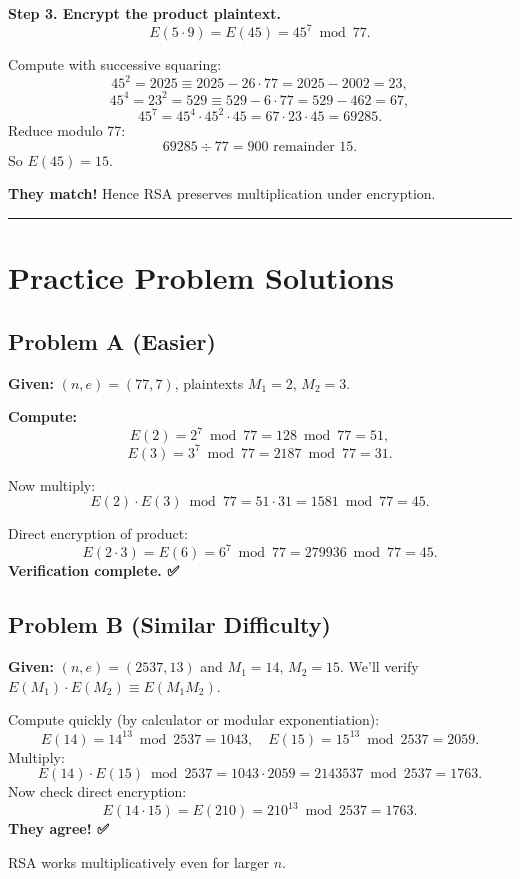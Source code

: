 \documentclass[12pt]{article}
\begin{document}
\textbf{Step 3. Encrypt the product plaintext.}
\[
E(5\cdot9) = E(45) = 45^7 \bmod 77.
\]

Compute with successive squaring:
\[
45^2 = 2025 \equiv 2025 - 26\cdot77 = 2025 - 2002 = 23,
\]
\[
45^4 = 23^2 = 529 \equiv 529 - 6\cdot77 = 529 - 462 = 67,
\]
\[
45^7 = 45^4 \cdot 45^2 \cdot 45 = 67 \cdot 23 \cdot 45 = 69285.
\]
Reduce modulo 77:
\[
69285 \div 77 = 900\text{ remainder }15.
\]
So \(E(45) = 15.\)

\textbf{They match!}  
Hence RSA preserves multiplication under encryption.

\bigskip
\hrule
\vspace{0.5em}

\section*{Practice Problem Solutions}

\subsection*{Problem A (Easier)}

\textbf{Given:} $(n,e)=(77,7)$, plaintexts $M_1=2$, $M_2=3$.

\textbf{Compute:}
\[
E(2)=2^7\bmod77=128\bmod77=51,
\]
\[
E(3)=3^7\bmod77=2187\bmod77=31.
\]

Now multiply:
\[
E(2)\cdot E(3)\bmod77=51\cdot31=1581\bmod77=45.
\]

Direct encryption of product:
\[
E(2\cdot3)=E(6)=6^7\bmod77=279936\bmod77=45.
\]
\textbf{Verification complete. ✅}

\bigskip

\subsection*{Problem B (Similar Difficulty)}

\textbf{Given:} $(n,e)=(2537,13)$ and $M_1=14$, $M_2=15$.  
We’ll verify \(E(M_1)\cdot E(M_2)\equiv E(M_1M_2)\).

Compute quickly (by calculator or modular exponentiation):
\[
E(14)=14^{13}\bmod2537=1043,\quad E(15)=15^{13}\bmod2537=2059.
\]
Multiply:
\[
E(14)\cdot E(15)\bmod2537 = 1043\cdot2059=2143537\bmod2537=1763.
\]
Now check direct encryption:
\[
E(14\cdot15)=E(210)=210^{13}\bmod2537=1763.
\]
\textbf{They agree! ✅}

RSA works multiplicatively even for larger $n$.

\bigskip
\end{document}
